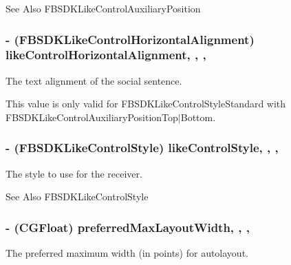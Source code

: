 \begin{DoxySeeAlso}{See Also}
F\-B\-S\-D\-K\-Like\-Control\-Auxiliary\-Position 
\end{DoxySeeAlso}
\hypertarget{interface_f_b_s_d_k_like_control_a09b382f7e6805a15fc7eaeaa0ebb8788}{
\subsubsection[{like\-Control\-Horizontal\-Alignment}]{\setlength{\rightskip}{0pt plus 5cm}-\/ (F\-B\-S\-D\-K\-Like\-Control\-Horizontal\-Alignment) like\-Control\-Horizontal\-Alignment\hspace{0.3cm}{\ttfamily [read]}, {\ttfamily [write]}, {\ttfamily [nonatomic]}, {\ttfamily [assign]}}}\label{interface_f_b_s_d_k_like_control_a09b382f7e6805a15fc7eaeaa0ebb8788}
The text alignment of the social sentence.

This value is only valid for F\-B\-S\-D\-K\-Like\-Control\-Style\-Standard with F\-B\-S\-D\-K\-Like\-Control\-Auxiliary\-Position\-Top$\vert$\-Bottom. \hypertarget{interface_f_b_s_d_k_like_control_a4e8264601868efeebbbb247892f95240}{
\subsubsection[{like\-Control\-Style}]{\setlength{\rightskip}{0pt plus 5cm}-\/ (F\-B\-S\-D\-K\-Like\-Control\-Style) like\-Control\-Style\hspace{0.3cm}{\ttfamily [read]}, {\ttfamily [write]}, {\ttfamily [nonatomic]}, {\ttfamily [assign]}}}\label{interface_f_b_s_d_k_like_control_a4e8264601868efeebbbb247892f95240}
The style to use for the receiver.

\begin{DoxySeeAlso}{See Also}
F\-B\-S\-D\-K\-Like\-Control\-Style 
\end{DoxySeeAlso}
\hypertarget{interface_f_b_s_d_k_like_control_a19bcd198e1f6697fa9740c82fbd00de9}{
\subsubsection[{preferred\-Max\-Layout\-Width}]{\setlength{\rightskip}{0pt plus 5cm}-\/ (C\-G\-Float) preferred\-Max\-Layout\-Width\hspace{0.3cm}{\ttfamily [read]}, {\ttfamily [write]}, {\ttfamily [nonatomic]}, {\ttfamily [assign]}}}\label{interface_f_b_s_d_k_like_control_a19bcd198e1f6697fa9740c82fbd00de9}
The preferred maximum width (in points) for autolayout.

